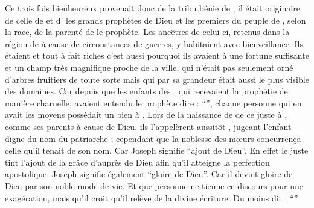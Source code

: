 Ce trois fois bienheureux provenait donc de la tribu bénie de , 
il était originaire de celle de  et d' %
les grands prophètes de Dieu et les premiers du peuple de ,
selon la race, de la parenté de  le prophète. 
Les ancêtres de celui-ci, retenus dans la région de  à cause de circonstances de guerres, %
y habitaient avec bienveillance. %
Ils étaient  et tout à fait riches
 c'est aussi pourquoi ils avaient à  une fortune suffisante et un  champ très magnifique proche de la ville, qui n'était pas seulement orné d'arbres fruitiers de toute sorte%
mais qui par sa grandeur était aussi  le plus visible des domaines.
Car depuis que les enfants des , qui recevaient la prophétie de manière charnelle, avaient entendu le prophète   dire : \enquote{}, chaque personne qui en avait les moyens possédait un bien à .
\pend
\pstart
{}Lors de la naissance de de ce juste à , comme ses parents   à cause de Dieu, 
ils l'appelèrent aussitôt , jugeant l'enfant digne du nom du patriarche ; 
cependant que la noblesse des mœurs concurrença celle qu'il tenait de son nom.
Car Joseph signifie \enquote{ajout de Dieu}.
En effet le juste tint l'ajout de la grâce d'auprès de Dieu afin qu'il atteigne la perfection apostolique.
Joseph signifie également \enquote{gloire de Dieu}. %
Car il devint gloire de Dieu par son noble mode de vie.
Et que personne ne tienne ce discours pour une  exagération, 
mais qu'il croit qu'il relève de la divine écriture.
Du moins  dit : \enquote{}
